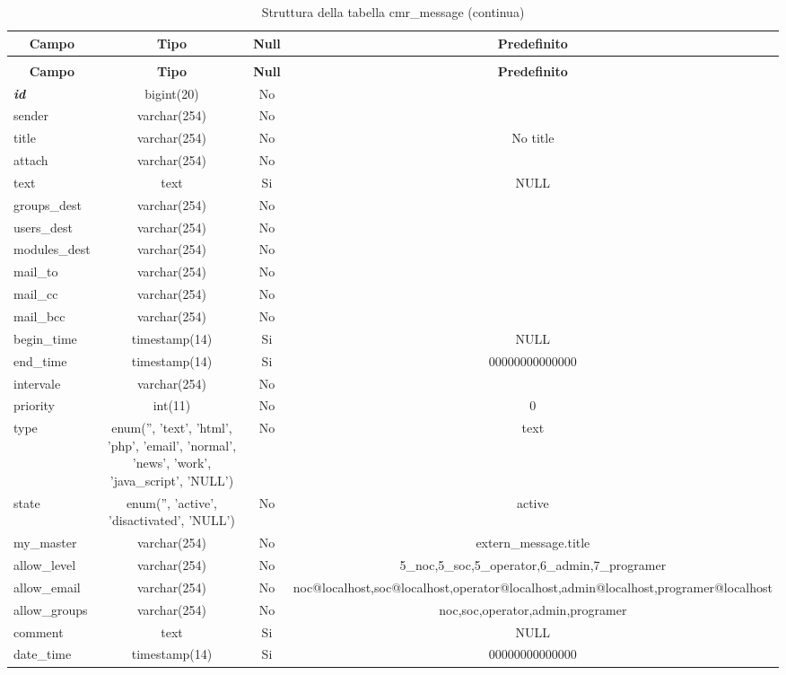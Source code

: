%
%
 \begin{longtable}{|l|c|c|c|} 
 \caption{Struttura della tabella cmr\_message} \label{tab:cmr_message-structure} \\
 \hline \multicolumn{1}{|c|}{\textbf{Campo}} & \multicolumn{1}{|c|}{\textbf{Tipo}} & \multicolumn{1}{|c|}{\textbf{Null}} & \multicolumn{1}{|c|}{\textbf{Predefinito}} \\ \hline \hline
\endfirsthead
 \caption{Struttura della tabella cmr\_message (continua)} \\ 
 \hline \multicolumn{1}{|c|}{\textbf{Campo}} & \multicolumn{1}{|c|}{\textbf{Tipo}} & \multicolumn{1}{|c|}{\textbf{Null}} & \multicolumn{1}{|c|}{\textbf{Predefinito}} \\ \hline \hline \endhead \endfoot \textbf{\textit{id}} & bigint(20) &  No  &  \\ \hline 
sender & varchar(254) &  No  &  \\ \hline 
title & varchar(254) &  No  & No title \\ \hline 
attach & varchar(254) &  No  &  \\ \hline 
text & text &  Si  & NULL \\ \hline 
groups\_dest & varchar(254) &  No  &  \\ \hline 
users\_dest & varchar(254) &  No  &  \\ \hline 
modules\_dest & varchar(254) &  No  &  \\ \hline 
mail\_to & varchar(254) &  No  &  \\ \hline 
mail\_cc & varchar(254) &  No  &  \\ \hline 
mail\_bcc & varchar(254) &  No  &  \\ \hline 
begin\_time & timestamp(14) &  Si  & NULL \\ \hline 
end\_time & timestamp(14) &  Si  & 00000000000000 \\ \hline 
intervale & varchar(254) &  No  &  \\ \hline 
priority & int(11) &  No  & 0 \\ \hline 
type & enum('', 'text', 'html', 'php', 'email', 'normal', 'news', 'work', 'java\_script', 'NULL') &  No  & text \\ \hline 
state & enum('', 'active', 'disactivated', 'NULL') &  No  & active \\ \hline 
my\_master & varchar(254) &  No  & extern\_message.title \\ \hline 
allow\_level & varchar(254) &  No  & 5\_noc,5\_soc,5\_operator,6\_admin,7\_programer \\ \hline 
allow\_email & varchar(254) &  No  & noc@localhost,soc@localhost,operator@localhost,admin@localhost,programer@localhost \\ \hline 
allow\_groups & varchar(254) &  No  & noc,soc,operator,admin,programer \\ \hline 
comment & text &  Si  & NULL \\ \hline 
date\_time & timestamp(14) &  Si  & 00000000000000 \\ \hline 
 \end{longtable}

